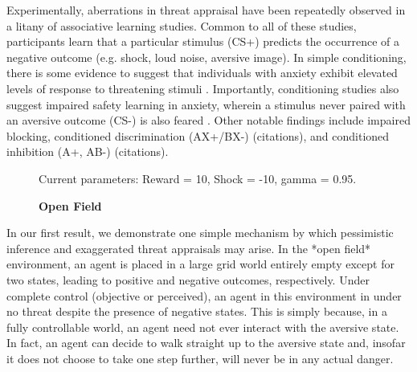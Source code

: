 \documentclass[11pt]{article} %
\begin{document}
Experimentally, aberrations in threat appraisal have been repeatedly observed
in a litany of associative learning studies. Common to all of these studies,
participants learn that a particular stimulus (CS+) predicts the occurrence
of a negative outcome (e.g. shock, loud noise, aversive image). In simple conditioning,
there is some evidence to suggest that individuals with anxiety exhibit elevated
levels of response to threatening stimuli \citep{lissek2005, MinekaOehlberg2008,
Duits2015}. Importantly, conditioning studies also suggest impaired safety learning
in anxiety, wherein a stimulus never paired with an aversive outcome (CS-) is also
feared \citep{Duits2015}. Other notable findings include impaired blocking,
conditioned discrimination (AX+/BX-) (citations), and conditioned inhibition
(A+, AB-) (citations).


\begin{figure}
  \centerline{%
  }
  \caption{\textbf{Open Field}}
  \par Current parameters: Reward = 10, Shock = -10, gamma = 0.95.
\end{figure}

In our first result, we demonstrate one simple mechanism by which pessimistic
inference and exaggerated threat appraisals may arise. In the *open field* environment,
an agent is placed in a large grid world entirely empty except for two states,
leading to positive and negative outcomes, respectively. Under complete control
(objective or perceived), an agent in this environment in under no threat despite
the presence of negative states. This is simply because, in a fully controllable
world, an agent need not ever interact with the aversive state. In fact, an agent
can decide to walk straight up to the aversive state and, insofar it does not
choose to take one step further, will never be in any actual danger.
\end{document}
